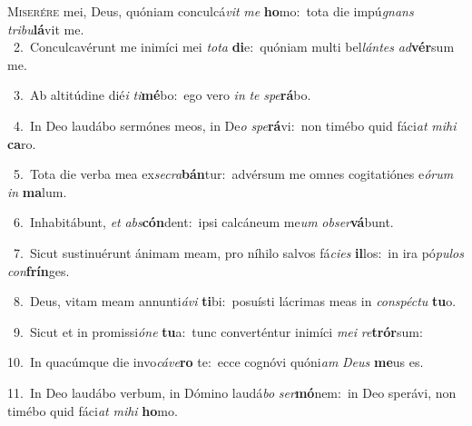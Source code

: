 \lettrine{\initial\textcolor{\initialcolor}{M}}{iserére} mei, Deus, quóniam conculcá\textit{vit} \textit{me} \textbf{ho}\-mo:~\star tota die impú\textit{gnans} \textit{tri}\-\textit{bu}\textbf{lá}vit me.\\
{\numbfont\textcolor{\numbcolor}{~2.}}~Conculcavérunt me inimíci mei \textit{to}\-\textit{ta} \textbf{di}\-e:~\star quóniam multi bel\-\textit{lán}\-\textit{tes} \textit{ad}\-\textbf{vér}sum me.\par
{\numbfont\textcolor{\numbcolor}{~3.}}~Ab altitúdine dié\textit{i} \textit{ti}\-\textbf{mé}bo:~\star ego vero \textit{in} \textit{te} \textit{spe}\-\textbf{rá}bo.\par
{\numbfont\textcolor{\numbcolor}{~4.}}~In Deo laudábo sermónes meos, in De\textit{o} \textit{spe}\-\textbf{rá}vi:~\star non timébo quid fáci\textit{at} \textit{mi}\-\textit{hi} \textbf{ca}\-ro.\par
{\numbfont\textcolor{\numbcolor}{~5.}}~Tota die verba mea ex\-\textit{se}\-\textit{cra}\textbf{bán}tur:~\star advérsum me omnes cogitatiónes e\-\textit{ó}\-\textit{rum} \textit{in} \textbf{ma}\-lum.\par
{\numbfont\textcolor{\numbcolor}{~6.}}~Inhabitábunt, \textit{et} \textit{abs}\-\textbf{cón}dent:~\star ipsi calcáneum me\textit{um} \textit{ob}\-\textit{ser}\textbf{vá}bunt.\par
{\numbfont\textcolor{\numbcolor}{~7.}}~Sicut sustinuérunt ánimam meam, pro níhilo salvos fá\-\textit{ci}\-\textit{es} \textbf{il}\-los:~\star in ira pó\-\textit{pu}\-\textit{los} \textit{con}\-\textbf{frín}ges.\par
{\numbfont\textcolor{\numbcolor}{~8.}}~Deus, vitam meam annunti\-\textit{á}\-\textit{vi} \textbf{ti}\-bi:~\star posuísti lácrimas meas in \textit{con}\-\textit{spéc}\textit{tu} \textbf{tu}\-o.\par
{\numbfont\textcolor{\numbcolor}{~9.}}~Sicut et in promissi\-\textit{ó}\-\textit{ne} \textbf{tu}\-a:~\star tunc converténtur inimíci \textit{me}\-\textit{i} \textit{re}\-\textbf{trór}sum:\par
{\numbfont\textcolor{\numbcolor}{10.}}~In quacúmque die invo\-\textit{cá}\-\textit{ve}\textbf{ro} te:~\star ecce cognóvi quóni\textit{am} \textit{De}\-\textit{us} \textbf{me}\-us es.\par
{\numbfont\textcolor{\numbcolor}{11.}}~In Deo laudábo verbum, in Dómino laudá\textit{bo} \textit{ser}\-\textbf{mó}nem:~\star in Deo sperávi, non timébo quid fáci\textit{at} \textit{mi}\-\textit{hi} \textbf{ho}\-mo.\par
